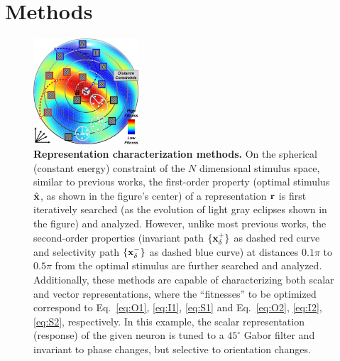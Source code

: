 \documentclass[10pt,twocolumn,letterpaper]{article}
\begin{document}
\section{Methods}

\begin{figure}
\begin{center}
\includegraphics[width=0.35\textwidth]{Figs/methods.pdf} 
\end{center}
\caption{{\bf Representation characterization methods.}
On the spherical (\ie constant energy) constraint of the $N$ dimensional stimulus space, similar to previous works, the first-order property (\ie optimal stimulus $\hat{\bf{x}}$, as shown in the figure's center) of a representation $\bf{r}$ is first iteratively searched (as the evolution of light gray eclipses shown in the figure) and analyzed.
However, unlike most previous works, the second-order properties (\ie invariant path $\lbrace \bf{x}^{+}_{\delta} \rbrace$ as dashed red curve and selectivity path $\lbrace \bf{x}^{-}_{\delta} \rbrace$ as dashed blue curve) at distances $0.1\pi$ to $0.5\pi$ from the optimal stimulus are further searched and analyzed.
Additionally, these methods are capable of characterizing both scalar and vector representations, where the ``fitnesses'' to be optimized correspond to Eq.~\ref{eq:O1}, \ref{eq:I1}, \ref{eq:S1} and Eq.~\ref{eq:O2}, \ref{eq:I2}, \ref{eq:S2}, respectively.
In this example, the scalar representation (\ie response) of the given neuron is tuned to a $45^{\circ}$ Gabor filter and invariant to phase changes, but selective to orientation changes.
}
\label{fig:methods}
\end{figure}

\end{document}
